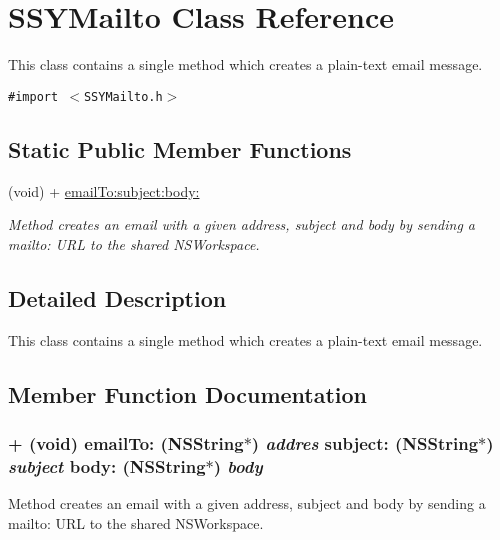\hypertarget{interface_s_s_y_mailto}{
\section{SSYMailto Class Reference}
\label{interface_s_s_y_mailto}
}
This class contains a single method which creates a plain-text email message.  


{\tt \#import $<$SSYMailto.h$>$}

\subsection*{Static Public Member Functions}
\begin{CompactItemize}
\item 
(void) + \hyperlink{interface_s_s_y_mailto_a9925b568e39a361c17aa3eda2d6245c}{emailTo:subject:body:}
\begin{CompactList}\small\item\em Method creates an email with a given address, subject and body by sending a mailto: URL to the shared NSWorkspace. \item\end{CompactList}\end{CompactItemize}


\subsection{Detailed Description}
This class contains a single method which creates a plain-text email message. 

\subsection{Member Function Documentation}
\hypertarget{interface_s_s_y_mailto_a9925b568e39a361c17aa3eda2d6245c}{
\subsubsection[{emailTo:subject:body:}]{\setlength{\rightskip}{0pt plus 5cm}+ (void) emailTo: (NSString$\ast$) {\em addres}\/ subject: (NSString$\ast$) {\em subject}\/ body: (NSString$\ast$) {\em body}}}
\label{interface_s_s_y_mailto_a9925b568e39a361c17aa3eda2d6245c}


Method creates an email with a given address, subject and body by sending a mailto: URL to the shared NSWorkspace. 

